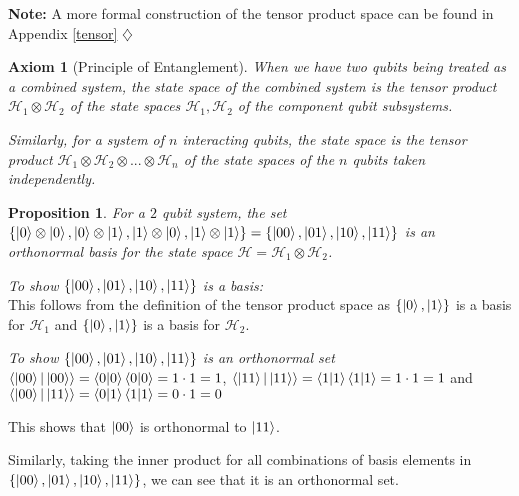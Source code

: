 \documentclass[12pt,twoside,fleqn]{report}
\makeatletter
\theoremstyle{thmstyle}
\renewenvironment{proof}[1][\proofname]{\par
\pushQED{\qed}%
\normalfont \topsep6\p@\@plus6\p@\relax
\trivlist
\item[\hskip\labelsep\itshape#1\@addpunct{.}]\mbox{}\par\nobreak\ignorespaces
}{%
    \popQED\endtrivlist\@endpefalse
    }
\newtheorem{prop}{Proposition}[chapter]
\newtheorem{axiom}{Axiom}[chapter]
\newenvironment{note}{\textbf{Note:}}{\hfill\ensuremath{\diamondsuit}}
\makeatother
\begin{document}
\begin{note}
    A more formal construction of the tensor product space can be found in Appendix \ref{tensor}
\end{note}



\begin{samepage}
    \begin{mdframed}
\begin{axiom}[Principle of Entanglement]
When we have two qubits being treated as a combined system, the state space of the combined system is the tensor product $\mathcal{H}_1 \otimes \mathcal{H}_2$ of the state spaces $\mathcal{H}_1, \mathcal{H}_2$ of the component qubit subsystems. 

    Similarly, for a system of $n$ interacting qubits, the state space is the tensor product $\mathcal{H}_1 \otimes \mathcal{H}_2 \otimes ... \otimes \mathcal{H}_n$ of the state spaces of the $n$ qubits taken independently.
\end{axiom}
    \end{mdframed}
\end{samepage}


\begin{prop}
    For a $2$ qubit system, the set $\{ \ket{0} \otimes \ket{0}, \ket{0} \otimes \ket{1}, \ket{1} \otimes \ket{0}, \ket{1} \otimes \ket{1} \} = \{ \ket{00}, \ket{01}, \ket{10}, \ket{11} \}$ is an orthonormal basis for the state space $\mathcal{H} = \mathcal{H}_1 \otimes \mathcal{H}_2$.
\end{prop}
\begin{proof}
    \emph{To show  $\{ \ket{00}, \ket{01}, \ket{10}, \ket{11} \}$ is a basis: } \\

    This follows from the definition of the tensor product space as $\{ \ket{0}, \ket{1} \}$ is a basis for $\mathcal{H}_1$ and $\{ \ket{0}, \ket{1} \}$ is a basis for $\mathcal{H}_2$.

    \emph{To show $\{ \ket{00}, \ket{01}, \ket{10}, \ket{11} \}$ is an orthonormal set} \\
    $\braket{ \ket{00} | \ket{00}} = \braket{0|0} \braket{0|0} = 1 \cdot 1 = 1$, 
    $\braket{ \ket{11} | \ket{11}} = \braket{1|1} \braket{1|1} = 1 \cdot 1 = 1$
    and $\braket{ \ket{00} | \ket{11}} = \braket{0|1} \braket{1|1} = 0 \cdot 1 = 0$

    This shows that $\ket{00}$ is orthonormal to $\ket{11}$. 

    Similarly, taking the inner product for all combinations of basis elements in $\{ \ket{00}, \ket{01}, \ket{10}, \ket{11} \}$, we can see that it is an orthonormal set.
\end{proof}
\end{document}
